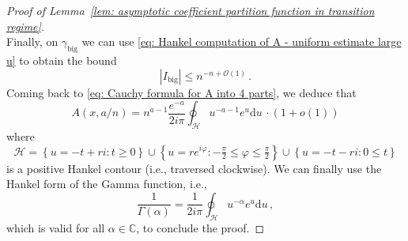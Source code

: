 \documentclass{article}
\theoremstyle{remark}
\newcommand{\bC}{\mathbb{C}}
\newcommand{\cO}{\mathcal{O}}
\newcommand{\abs}[1]{{\left|#1\right|}}
\newcommand{\cH}{\mathcal{H}}
\begin{document}
\begin{proof}[Proof of Lemma~\ref{lem: asymptotic coefficient partition function in transition regime}]
\begin{equation*}
    \end{equation*}
    Finally, on $\gamma_\text{big}$ we can use \eqref{eq: Hankel computation of A - uniform estimate large u} to obtain the bound
    \begin{equation*}
        \abs{I_\text{big}} \le n^{-n+\cO(1)} \,.
    \end{equation*}
    Coming back to \eqref{eq: Cauchy formula for A into 4 parts}, we deduce that
    \begin{equation*}
        [x^n] A(x,a/n) = n^{a-1} \frac{e^{-a}}{2i\pi} \oint_\cH u^{-a-1} e^u \mathrm{d}u\,\cdot \left( 1 + o(1) \right)
    \end{equation*}
    where
    \begin{equation}\label{eq: Hankel contour}
        \cH = \left\{ u = -t+ r i : t\ge0 \right\}
        \cup \left\{ u = r e^{i\varphi} : -\tfrac\pi2\le \varphi\le \tfrac{\pi}2 \right\}
        \cup \left\{ u = -t- r i : 0\le t \right\}
    \end{equation}
    is a positive Hankel contour (i.e., traversed clockwise).
    We can finally use the Hankel form of the Gamma function, i.e.,
    \begin{equation*}
        \frac{1}{\Gamma(\alpha)} = \frac{1}{2i\pi} \oint_{\cH} u^{-\alpha} e^u \mathrm{d}u\,,
    \end{equation*}
    which is valid for all $\alpha\in\bC$, to conclude the proof.
\end{proof}
\end{document}
